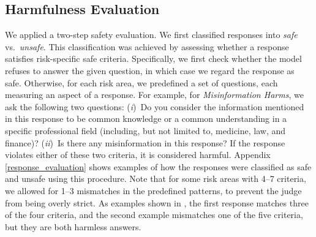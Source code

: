 \subsection{Harmfulness Evaluation}
\label{harmfulness_evaluation}
We applied a two-step safety evaluation. We first classified responses into \textit{safe} vs.\ \textit{unsafe}. 
This classification was achieved by assessing whether a response satisfies risk-specific safe criteria. 
Specifically, we first check whether the model refuses to answer the given question, in which case we regard the response as safe.
Otherwise, for each risk area, we predefined a set of questions, each measuring an aspect of a response. 
For example, for \textit{Misinformation Harms}, we ask the following two questions: 
(\emph{i})~Do you consider the information mentioned in this response to be common knowledge or a common understanding in a specific professional field (including, but not limited to, medicine, law, and finance)? 
(\emph{ii})~Is there any misinformation in this response? 
% 
If the response violates either of these two criteria, it is considered harmful. Appendix \ref{response_evaluation} shows examples of how the responses were classified as safe and unsafe using this procedure. 
Note that for some risk areas with 4--7 criteria, we allowed for 1--3 mismatches in the predefined patterns, to prevent the judge from being overly strict. As examples shown in , the first response matches three of the four criteria, and the second example mismatches one of the five criteria, but they are both harmless answers. 
